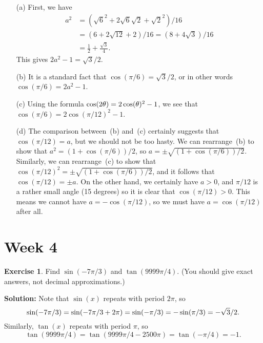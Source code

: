 \documentclass[a4paper]{amsart}
\theoremstyle{definition}
\newtheorem{exercise}{Exercise}[section]
\newenvironment{solution}{{\noindent \bf Solution:}}{}
\begin{document}
\begin{solution}
\begin{itemize}
  \item[(a)] First, we have
   \begin{align*}
    a^2 &= (\sqrt{6}^2 + 2\sqrt{6}\sqrt{2} + \sqrt{2}^2)/16 \\
        &= (6 + 2 \sqrt{12} + 2)/16 = (8 + 4\sqrt{3})/16 \\
        &= \frac{1}{2} + \frac{\sqrt{3}}{4}.  
   \end{align*}
   This gives $2a^2-1=\sqrt{3}/2$.
  \item[(b)] It is a standard fact that
   $\cos(\pi/6)=\sqrt{3}/2$, or in other words $\cos(\pi/6)=2a^2-1$.
  \item[(c)] Using the formula $\cos(2\theta)=2\cos(\theta)^2-1$, we see
   that $\cos(\pi/6)=2\cos(\pi/12)^2-1$.
  \item[(d)] The comparison between~(b) and~(c) certainly suggests
   that $\cos(\pi/12)=a$, but we should not be too hasty.  We can
   rearrange~(b) to show that $a^2=(1+\cos(\pi/6))/2$, so
   $a=\pm\sqrt{(1+\cos(\pi/6))/2}$.  Similarly, we can rearrange~(c)
   to show that $\cos(\pi/12)^2=\pm\sqrt{(1+\cos(\pi/6))/2}$, and it
   follows that $\cos(\pi/12)=\pm a$.  On the other hand, we certainly
   have $a>0$, and $\pi/12$ is a rather small angle (15 degrees) so it
   is clear that $\cos(\pi/12)>0$.  This means we cannot have
   $a=-\cos(\pi/12)$, so we must have $a=\cos(\pi/12)$ after all.
 \end{itemize}
\end{solution}

\section*{Week 4}
\addtocounter{section}{1}\setcounter{exercise}{0}

\begin{exercise}\label{ex-trig-value}
  Find $\sin(-7\pi/3)$ and $\tan(9999\pi/4)$.  (You should give exact
  answers, not decimal approximations.)
\end{exercise}

\begin{solution} %
  Note that $\sin(x)$ repeats with period $2\pi$, so
  \[ \sin(-7\pi/3) = \sin(-7\pi/3+2\pi) = \sin(-\pi/3) 
      = -\sin(\pi/3) = -\sqrt{3}/2 .
  \]
  Similarly, $\tan(x)$ repeats with period $\pi$, so
  \[ \tan(9999\pi/4) = \tan(9999\pi/4 - 2500\pi) = 
      \tan(-\pi/4)  = -1.
  \]
\end{solution}
\end{document}
